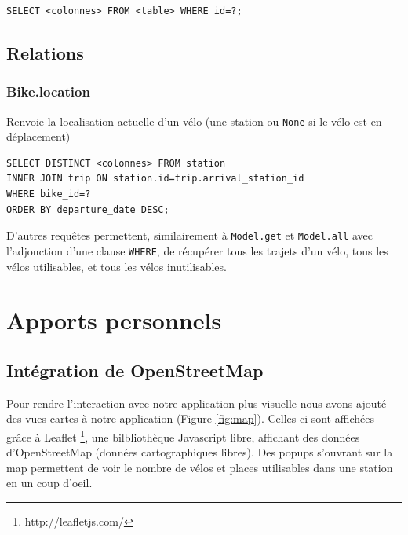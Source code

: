 \documentclass[a4paper,10pt]{article}
\begin{document}
\begin{lstlisting}
SELECT <colonnes> FROM <table> WHERE id=?;
\end{lstlisting}

\subsection{Relations}
\subsubsection{Bike.location}
Renvoie la localisation actuelle d'un vélo (une station ou \texttt{None} si le vélo est en déplacement)
\begin{lstlisting}
SELECT DISTINCT <colonnes> FROM station
INNER JOIN trip ON station.id=trip.arrival_station_id
WHERE bike_id=?
ORDER BY departure_date DESC;
\end{lstlisting}

D'autres requêtes permettent, similairement à \texttt{Model.get} et \texttt{Model.all}
avec l'adjonction d'une clause \lstinline{WHERE}, de récupérer tous les trajets d'un vélo,
tous les vélos utilisables, et tous les vélos inutilisables.

\section{Apports personnels}

\subsection{Intégration de OpenStreetMap}
Pour rendre l'interaction avec notre application plus visuelle nous avons ajouté
des vues cartes à notre application (Figure \ref{fig:map}). Celles-ci sont affichées grâce à Leaflet
\footnote{http://leafletjs.com/}, une bilbliothèque Javascript libre, affichant
des données d'OpenStreetMap (données cartographiques libres). Des popups
s'ouvrant sur la map permettent de voir le nombre de vélos et places utilisables
dans une station en un coup d'oeil.
\end{document}

